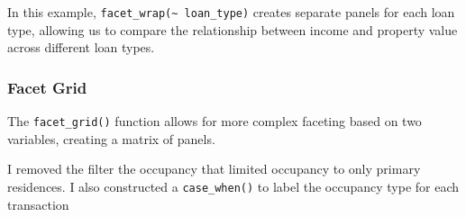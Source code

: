 \documentclass[
]{book}
\begin{document}
In this example, \texttt{facet\_wrap(\textasciitilde{}\ loan\_type)} creates separate panels for each loan type, allowing us to compare the relationship between income and property value across different loan types.

\hypertarget{facet-grid}{%
\subsubsection*{Facet Grid}\label{facet-grid}}

The \texttt{facet\_grid()} function allows for more complex faceting based on two variables, creating a matrix of panels.

I removed the filter the occupancy that limited occupancy to only primary residences. I also constructed a \texttt{case\_when()} to label the occupancy type for each transaction
\end{document}
